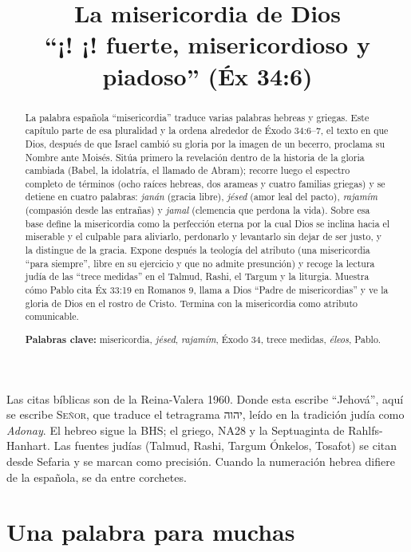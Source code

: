 \documentclass[11pt,letterpaper]{article}
\title{\color{azul}\bfseries La misericordia de Dios\\[4pt]\large\color{gris}\mdseries ``¡\SENOR! ¡\SENOR! fuerte, misericordioso y piadoso'' (Éx 34:6)}
\author{}\date{}
\newcommand{\heb}[1]{\mbox{\foreignlanguage{hebrew}{#1}}}
\newcommand{\SENOR}{\textsc{Señor}}
\begin{document}
\maketitle\thispagestyle{empty}

\begin{abstract}\noindent
La palabra española ``misericordia'' traduce varias palabras hebreas y griegas. Este capítulo parte de esa pluralidad y la ordena alrededor de Éxodo 34:6--7, el texto en que Dios, después de que Israel cambió su gloria por la imagen de un becerro, proclama su Nombre ante Moisés. Sitúa primero la revelación dentro de la historia de la gloria cambiada (Babel, la idolatría, el llamado de Abram); recorre luego el espectro completo de términos (ocho raíces hebreas, dos arameas y cuatro familias griegas) y se detiene en cuatro palabras: \emph{janán} (gracia libre), \emph{jésed} (amor leal del pacto), \emph{rajamím} (compasión desde las entrañas) y \emph{jamal} (clemencia que perdona la vida). Sobre esa base define la misericordia como la perfección eterna por la cual Dios se inclina hacia el miserable y el culpable para aliviarlo, perdonarlo y levantarlo sin dejar de ser justo, y la distingue de la gracia. Expone después la teología del atributo (una misericordia ``para siempre'', libre en su ejercicio y que no admite presunción) y recoge la lectura judía de las ``trece medidas'' en el Talmud, Rashi, el Targum y la liturgia. Muestra cómo Pablo cita Éx 33:19 en Romanos 9, llama a Dios ``Padre de misericordias'' y ve la gloria de Dios en el rostro de Cristo. Termina con la misericordia como atributo comunicable.
\par\smallskip\noindent\textbf{Palabras clave:} misericordia, \emph{jésed}, \emph{rajamím}, Éxodo 34, trece medidas, \emph{éleos}, Pablo.\end{abstract}

\begin{nota}
Las citas bíblicas son de la Reina-Valera 1960. Donde esta escribe ``Jehová'', aquí se escribe \SENOR, que traduce el tetragrama \heb{יהוה}, leído en la tradición judía como \emph{Adonay}. El hebreo sigue la BHS; el griego, NA28 y la Septuaginta de Rahlfs-Hanhart. Las fuentes judías (Talmud, Rashi, Targum Ónkelos, Tosafot) se citan desde Sefaria y se marcan como precisión. Cuando la numeración hebrea difiere de la española, se da entre corchetes.
\end{nota}

\section{Una palabra para muchas}
\end{document}
